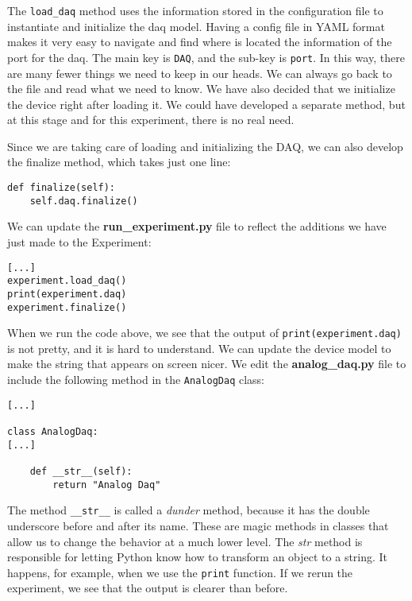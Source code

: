 The \texttt{load\_daq} method uses the information stored in the configuration file to instantiate and initialize the daq model. Having a config file in YAML format makes it very easy to navigate and find where is located the information of the port for the daq. The main key is \texttt{DAQ}, and the sub-key is \texttt{port}. In this way, there are many fewer things we need to keep in our heads. We can always go back to the file and read what we need to know. We have also decided that we initialize the device right after loading it. We could have developed a separate method, but at this stage and for this experiment, there is no real need.

Since we are taking care of loading and initializing the DAQ, we can also develop the finalize method, which takes just one line:

\begin{verbatim}
def finalize(self):
    self.daq.finalize()
\end{verbatim}

We can update the \textbf{run\_experiment.py} file to reflect the additions we have just made to the Experiment:

\begin{verbatim}
[...]
experiment.load_daq()
print(experiment.daq)
experiment.finalize()
\end{verbatim}

When we run the code above, we see that the output of \texttt{print(experiment.daq)} is not pretty, and it is hard to understand. We can update the device model to make the string that appears on screen nicer. We edit the \textbf{analog\_daq.py} file to include the following method in the \texttt{AnalogDaq} class:

\begin{verbatim}
[...]

class AnalogDaq:
[...]

    def __str__(self):
        return "Analog Daq"
\end{verbatim}

The method \texttt{\_\_str\_\_} is called a \emph{dunder} method, because it has the double underscore before and after its name. These are magic methods in classes that allow us to change the behavior at a much lower level. The \emph{str} method is responsible for letting Python know how to transform an object to a string. It happens, for example, when we use the \texttt{print} function. If we rerun the experiment, we see that the output is clearer than before.

